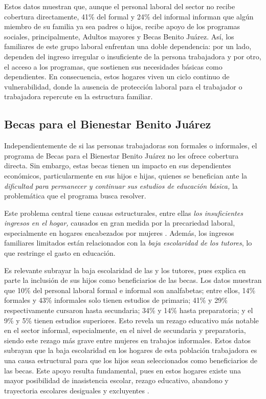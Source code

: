 \documentclass[
  spanish,
  11pt,
  a4paper,
]{scrbook}
\begin{document}
Estos datos muestran que, aunque el personal laboral del sector no
recibe cobertura directamente, 41\% del formal y 24\% del informal
informan que algún miembro de su familia ya sea padres o hijos, recibe
apoyo de los programas sociales, principalmente, Adultos mayores y Becas
Benito Juárez. Así, los familiares de este grupo laboral enfrentan una
doble dependencia: por un lado, dependen del ingreso irregular o
insuficiente de la persona trabajadora y por otro, el acceso a los
programas, que sostienen sus necesidades básicas como dependientes. En
consecuencia, estos hogares viven un ciclo continuo de vulnerabilidad,
donde la ausencia de protección laboral para el trabajador o trabajadora
repercute en la estructura familiar.

\subsection*{Becas para el Bienestar Benito
Juárez}\label{becas-para-el-bienestar-benito-juuxe1rez}

Independientemente de si las personas trabajadoras son formales o
informales, el programa de Becas para el Bienestar Benito Juárez no les
ofrece cobertura directa. Sin embargo, estas becas tienen un impacto en
sus dependientes económicos, particularmente en sus hijos e hijas,
quienes se benefician ante la \emph{dificultad para permanecer y
continuar sus estudios de educación básica,} la problemática que el
programa busca resolver.

Este problema central tiene causas estructurales, entre ellas \emph{los
insuficientes ingresos en el hogar,} causados en gran medida por la
precariedad laboral, especialmente en hogares encabezados por mujeres
\autocite{CONEVAL2024}. Además, los ingresos familiares limitados están
relacionados con la \emph{baja escolaridad de los tutores}, lo que
restringe el gasto en educación.

Es relevante subrayar la baja escolaridad de las y los tutores, pues
explica en parte la inclusión de sus hijos como beneficiarios de las
becas. Los datos muestran que 10\% del personal laboral formal e
informal son analfabetas; entre ellos, 14\% formales y 43\% informales
solo tienen estudios de primaria; 41\% y 29\% respectivamente cursaron
hasta secundaria; 34\% y 14\% hasta preparatoria; y el 9\% y 5\% tienen
estudios superiores. Esto revela un rezago educativo más notable en el
sector informal, especialmente, en el nivel de secundaria y
preparatoria, siendo este rezago más grave entre mujeres en trabajos
informales. Estos datos subrayan que la baja escolaridad en los hogares
de esta población trabajadora es una causa estructural para que los
hijos sean seleccionados como beneficiarios de las becas. Este apoyo
resulta fundamental, pues en estos hogares existe una mayor posibilidad
de inasistencia escolar, rezago educativo, abandono y trayectoria
escolares desiguales y excluyentes \autocite{CONEVAL2024}.
\end{document}
